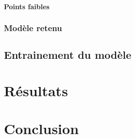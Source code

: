 \paragraph{Points faibles}

\subsubsection{Modèle retenu}




\subsection{Entrainement du modèle}



\section{Résultats}



\section{Conclusion}



